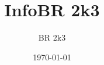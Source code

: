 \documentclass[a4paper,11pt]{article}
\title{InfoBR 2k3}
\author{BR 2k3}
\date{\today}
\begin{document}
\maketitle



\pagebreak
\tableofcontents

\pagebreak


\pagebreak


\pagebreak


\pagebreak

\end{document}

